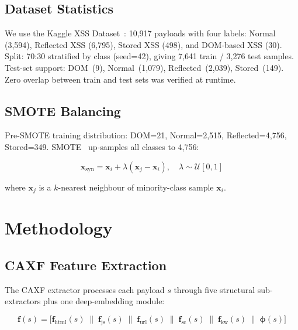 \documentclass[conference]{IEEEtran}
\begin{document}
\subsection{Dataset Statistics}

We use the Kaggle XSS Dataset~\cite{kaggle_xss}: 10,917 payloads with four
labels: Normal (3,594), Reflected XSS (6,795), Stored XSS (498), and
DOM-based XSS (30). Split: 70:30 stratified by class (seed=42), giving
7,641 train / 3,276 test samples. Test-set support: DOM~(9), Normal~(1,079),
Reflected~(2,039), Stored~(149). Zero overlap between train and test sets
was verified at runtime.

\subsection{SMOTE Balancing}

Pre-SMOTE training distribution: DOM=21, Normal=2,515, Reflected=4,756,
Stored=349. SMOTE~\cite{smote2002} up-samples all classes to 4,756:

\begin{equation}
  \mathbf{x}_{\text{syn}} = \mathbf{x}_i +
    \lambda (\mathbf{x}_j - \mathbf{x}_i),
  \quad \lambda \sim \mathcal{U}[0,1]
  \label{eq:smote}
\end{equation}

where $\mathbf{x}_j$ is a $k$-nearest neighbour of minority-class sample
$\mathbf{x}_i$.

\section{Methodology}
\label{sec:methodology}

\subsection{CAXF Feature Extraction}

The CAXF extractor processes each payload $s$ through five structural
sub-extractors plus one deep-embedding module:

\begin{equation}
  \mathbf{f}(s) = \bigl[\mathbf{f}_{\text{html}}(s) \;\|\;
    \mathbf{f}_{\text{js}}(s) \;\|\;
    \mathbf{f}_{\text{url}}(s) \;\|\;
    \mathbf{f}_{\text{sc}}(s) \;\|\;
    \mathbf{f}_{\text{kw}}(s) \;\|\;
    \boldsymbol{\phi}(s)\bigr]
  \label{eq:caxf}
\end{equation}
\end{document}
